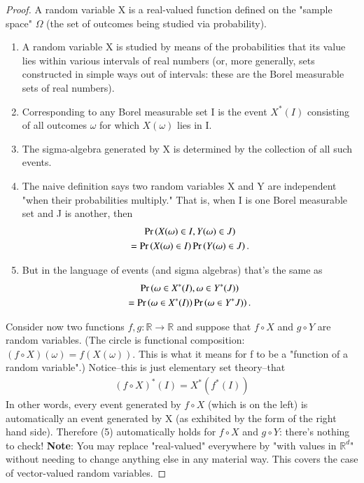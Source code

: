 \documentclass[journal,12pt,twocolumn]{IEEEtran}
\begin{document}
\begin{proof}
 A random variable X is a real-valued function defined on the "sample space" $\Omega$ (the set of outcomes being studied via probability).
 \begin{enumerate}
     \item A random variable X is studied by means of the probabilities that its value lies within various intervals of real numbers (or, more generally, sets constructed in simple ways out of intervals: these are the Borel measurable sets of real numbers).
     \item Corresponding to any Borel measurable set I is the event $X^*(I)$ consisting of all outcomes $\omega$ for which $X(\omega)$ lies in I.
     \item The sigma-algebra generated by X is determined by the collection of all such events.
     \item The naive definition says two random variables X and Y are independent "when their probabilities multiply." That is, when I is one Borel measurable set and J is another, then 
\begin{multline}
    \Pr\left(X(\omega)\in I , Y(\omega)\in J\right)\\=\Pr\left(X(\omega)\in I\right)\Pr\left(Y(\omega)\in J\right).
\end{multline}
\item But in the language of events (and sigma algebras) that's the same as
\begin{multline}
    \Pr\left(\omega \in X^*(I) , \omega \in Y^*(J)\right)\\=\Pr\left(\omega \in X^*(I)\right)\Pr\left(\omega \in Y^*J)\right).
\end{multline}
 \end{enumerate}
 Consider now two functions $f,g:\mathbb{R}\rightarrow \mathbb{R}$ and suppose that $f\circ X$ and $g\circ Y$ are random variables. (The circle is functional composition: $(f\circ X)(\omega)=f(X(\omega))$. This is what it means for f to be a "function of a random variable".) Notice--this is just elementary set theory--that
\begin{align}
    (f\circ X)^*(I)=X^*(f^*(I))
\end{align}
In other words, every event generated by $f\circ X$ (which is on the left) is automatically an event generated by X (as exhibited by the form of the right hand side). Therefore (5) automatically holds for $f\circ X$ and $g\circ Y$: there's nothing to check!
\textbf{Note}: You may replace "real-valued" everywhere by "with values in $\mathbb{R}^d$" without needing to change anything else in any material way. This covers the case of vector-valued random variables.
\end{proof}
\end{document}
